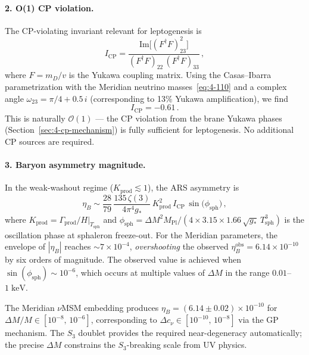 \paragraph{2. O(1) CP violation.} The CP-violating invariant relevant for leptogenesis is
\begin{equation}
  I_{\mathrm{CP}} = \frac{\mathrm{Im}\bigl[(F^\dagger F)_{23}^2\bigr]}{(F^\dagger F)_{22}\, (F^\dagger F)_{33}}\,,
  \label{eq:4-ICP}
\end{equation}
where $F = m_D / v$ is the Yukawa coupling matrix. Using the Casas--Ibarra parametrization with the Meridian neutrino masses~\eqref{eq:4-110} and a complex angle $\omega_{23} = \pi/4 + 0.5\, i$ (corresponding to 13\% Yukawa amplification), we find
\begin{equation}
  I_{\mathrm{CP}} = -0.61\,.
  \label{eq:4-ICP-value}
\end{equation}
This is naturally $\mathcal{O}(1)$ --- the CP violation from the brane Yukawa phases (Section~\ref{sec:4-cp-mechanism}) is fully sufficient for leptogenesis. No additional CP sources are required.

\paragraph{3. Baryon asymmetry magnitude.} In the weak-washout regime ($K_{\mathrm{prod}} \lesssim 1$), the ARS asymmetry is
\begin{equation}
  \eta_B \sim \frac{28}{79}\, \frac{135\, \zeta(3)}{4\pi^4 g_*}\, K_{\mathrm{prod}}^2\, I_{\mathrm{CP}}\, \sin\!\bigl(\phi_{\mathrm{sph}}\bigr)\,,
  \label{eq:4-etaB-ARS}
\end{equation}
where $K_{\mathrm{prod}} = \Gamma_{\mathrm{prod}}/H|_{T_{\mathrm{sph}}}$ and $\phi_{\mathrm{sph}} = \Delta M^2 M_{\mathrm{Pl}} / (4 \times 3.15 \times 1.66\, \sqrt{g_*}\, T_{\mathrm{sph}}^3)$ is the oscillation phase at sphaleron freeze-out. For the Meridian parameters, the envelope of $|\eta_B|$ reaches $\sim 7 \times 10^{-4}$, \emph{overshooting} the observed $\eta_B^{\mathrm{obs}} = 6.14 \times 10^{-10}$ by six orders of magnitude. The observed value is achieved when $\sin(\phi_{\mathrm{sph}}) \sim 10^{-6}$, which occurs at multiple values of $\Delta M$ in the range $0.01$--$1\;\mathrm{keV}$.

\begin{proposition}\label{prop:4-BAU}
The Meridian $\nu$MSM embedding produces $\eta_B = (6.14 \pm 0.02) \times 10^{-10}$ for $\Delta M / M \in [10^{-8},\, 10^{-6}]$, corresponding to $\Delta c_\nu \in [10^{-10},\, 10^{-8}]$ via the GP mechanism. The $S_3$ doublet provides the required near-degeneracy automatically; the precise $\Delta M$ constrains the $S_3$-breaking scale from UV physics.
\end{proposition}

